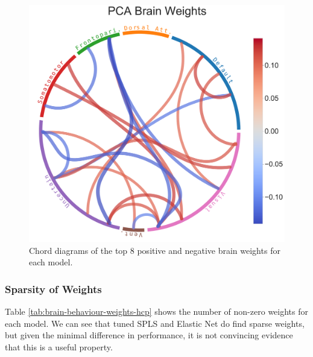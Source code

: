 \begin{figure}
\includegraphics[width=0.49\linewidth]{figures/hcp/PCA brain weights}
\caption{Chord diagrams of the top 8 positive and negative brain \gls{weights} for each model.}\label{fig:chord_weights}
\end{figure}

%
%

\subsubsection{Sparsity of Weights}

Table \ref{tab:brain-behaviour-weights-hcp} shows the number of non-zero \gls{weights} for each model.
We can see that tuned SPLS and Elastic Net do find sparse weights, but given the minimal difference in performance, it is not convincing evidence that this is a useful property.

